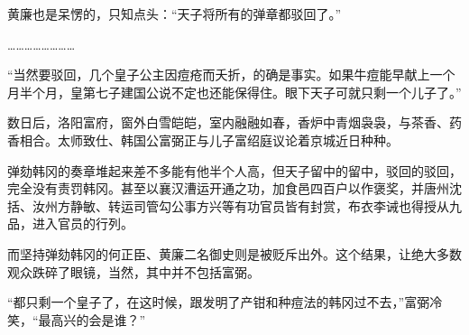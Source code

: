 黄廉也是呆愣的，只知点头：“天子将所有的弹章都驳回了。”

……………………

“当然要驳回，几个皇子公主因痘疮而夭折，的确是事实。如果牛痘能早献上一个月半个月，皇第七子建国公说不定也还能保得住。眼下天子可就只剩一个儿子了。”

数日后，洛阳富府，窗外白雪皑皑，室内融融如春，香炉中青烟袅袅，与茶香、药香相合。太师致仕、韩国公富弼正与儿子富绍庭议论着京城近日种种。

弹劾韩冈的奏章堆起来差不多能有他半个人高，但天子留中的留中，驳回的驳回，完全没有责罚韩冈。甚至以襄汉漕运开通之功，加食邑四百户以作褒奖，并唐州沈括、汝州方静敏、转运司管勾公事方兴等有功官员皆有封赏，布衣李诫也得授从九品，进入官员的行列。

而坚持弹劾韩冈的何正臣、黄廉二名御史则是被贬斥出外。这个结果，让绝大多数观众跌碎了眼镜，当然，其中并不包括富弼。

“都只剩一个皇子了，在这时候，跟发明了产钳和种痘法的韩冈过不去，”富弼冷笑，“最高兴的会是谁？”

